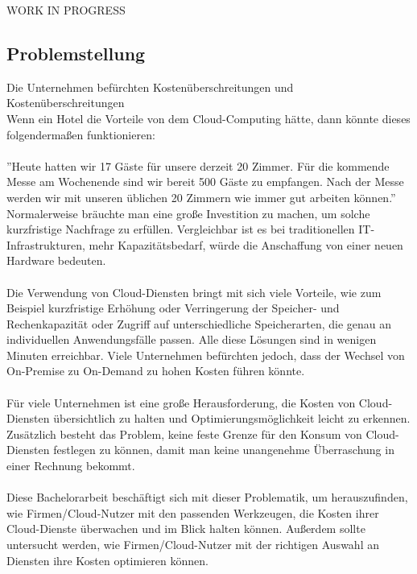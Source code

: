 WORK IN PROGRESS\\
\subsection{Problemstellung}
Die Unternehmen befürchten Kostenüberschreitungen und Kostenüberschreitungen  
\\
Wenn ein Hotel die Vorteile von dem Cloud-Computing hätte, dann könnte dieses folgendermaßen funktionieren:
\\\\
”Heute hatten wir 17 Gäste für unsere derzeit 20 Zimmer. Für die kommende Messe am Wochenende sind wir bereit 500 Gäste zu empfangen. Nach der Messe werden wir mit unseren üblichen 20 Zimmern wie immer gut arbeiten können.”
Normalerweise bräuchte man eine große Investition zu machen, um solche kurzfristige Nachfrage zu erfüllen. Vergleichbar ist es bei traditionellen IT-Infrastrukturen, mehr Kapazitätsbedarf, würde die Anschaffung von einer neuen Hardware bedeuten.
\\\\
Die Verwendung von Cloud-Diensten bringt mit sich viele Vorteile, wie zum Beispiel kurzfristige Erhöhung oder Verringerung der Speicher- und Rechenkapazität oder Zugriff auf unterschiedliche Speicherarten, die genau an individuellen Anwendungsfälle passen. Alle diese Lösungen sind in wenigen Minuten erreichbar. Viele Unternehmen befürchten jedoch, dass der Wechsel von On-Premise zu On-Demand zu hohen Kosten führen könnte.
\\\\
Für viele Unternehmen ist eine große Herausforderung, die Kosten von Cloud-Diensten übersichtlich zu halten und Optimierungsmöglichkeit leicht zu erkennen. Zusätzlich besteht das Problem, keine feste Grenze für den Konsum von Cloud-Diensten festlegen zu können, damit man keine unangenehme Überraschung in einer Rechnung bekommt. 
\\\\
Diese Bachelorarbeit beschäftigt sich mit dieser Problematik, um herauszufinden, wie Firmen/Cloud-Nutzer mit den passenden Werkzeugen, die Kosten ihrer Cloud-Dienste überwachen und im Blick halten können. Außerdem sollte untersucht werden, wie Firmen/Cloud-Nutzer mit der richtigen Auswahl an Diensten ihre Kosten optimieren können.


